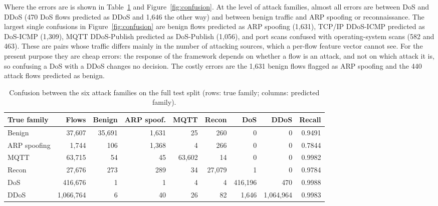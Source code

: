 \documentclass[preprint,12pt]{elsarticle}
\begin{document}
Where the errors are is shown in Table~\ref{tab:family} and Figure~\ref{fig:confusion}. At the level of attack families, almost all errors are between DoS and DDoS (470 DoS flows predicted as DDoS and 1,646 the other way) and between benign traffic and ARP spoofing or reconnaissance. The largest single confusions in Figure~\ref{fig:confusion} are benign flows predicted as ARP spoofing (1,631), TCP/IP DDoS-ICMP predicted as DoS-ICMP (1,309), MQTT DDoS-Publish predicted as DoS-Publish (1,056), and port scans confused with operating-system scans (582 and 463). These are pairs whose traffic differs mainly in the number of attacking sources, which a per-flow feature vector cannot see. For the present purpose they are cheap errors: the response of the framework depends on whether a flow is an attack, and not on which attack it is, so confusing a DoS with a DDoS changes no decision. The costly errors are the 1,631 benign flows flagged as ARP spoofing and the 440 attack flows predicted as benign.

\begin{table}[htbp]
\centering
\caption{Confusion between the six attack families on the full test split (rows: true family; columns: predicted family).}
\label{tab:family}
\scriptsize
\setlength{\tabcolsep}{3pt}
\begin{tabular}{@{}lrrrrrrrr@{}}
\toprule
True family & Flows & Benign & ARP spoof. & MQTT & Recon & DoS & DDoS & Recall \\
\midrule
Benign & 37,607 & 35,691 & 1,631 & 25 & 260 & 0 & 0 & 0.9491 \\
ARP spoofing & 1,744 & 106 & 1,368 & 4 & 266 & 0 & 0 & 0.7844 \\
MQTT & 63,715 & 54 & 45 & 63,602 & 14 & 0 & 0 & 0.9982 \\
Recon & 27,676 & 273 & 289 & 34 & 27,079 & 1 & 0 & 0.9784 \\
DoS & 416,676 & 1 & 1 & 4 & 4 & 416,196 & 470 & 0.9988 \\
DDoS & 1,066,764 & 6 & 40 & 26 & 82 & 1,646 & 1,064,964 & 0.9983 \\
\bottomrule
\end{tabular}
\end{table}
\end{document}

